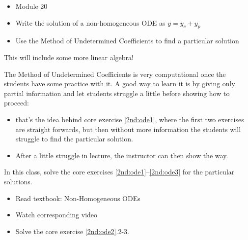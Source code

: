 \begin{lesson}

	\begin{itemize}
		\item Module 20
	\end{itemize}

	\begin{itemize}
		\item Write the solution of a non-homogeneous ODE as $y=y_c+y_p$
		\item Use the Method of Undetermined Coefficients to find a particular solution
	\end{itemize}
	

This will include some more linear algebra! 

The Method of Undetermined Coefficients is very computational once the students have some practice with it. A good way to learn it is by giving only partial information and let students struggle a little before showing how to proceed: 
\begin{itemize}
	\item that's the idea behind core exercise \ref{2nd:ode1}, where the first two exercises are straight forwards, but then without more information the students will struggle to find the particular solution.
	\item After a little struggle in lecture, the instructor can then show the way.
\end{itemize}


In this class, solve the core exercises \ref{2nd:ode1}--\ref{2nd:ode3} for the particular solutions.

\begin{itemize}
	\item Read textbook: Non-Homogeneous ODEs
	\item Watch corresponding video
	\item Solve the core exercise \ref{2nd:ode2}.2-3.
\end{itemize}

\end{lesson}




\standardonlynewpage

%
%



